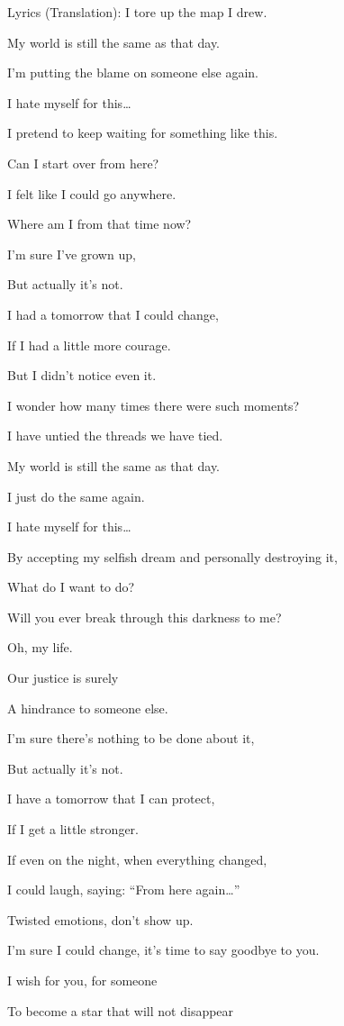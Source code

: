 \documentclass[
  letterpaper,
  DIV=11,
  numbers=noendperiod]{scrreprt}
\begin{document}
Lyrics (Translation): I tore up the map I drew.

My world is still the same as that day.

I'm putting the blame on someone else again.

I hate myself for this\ldots{}

I pretend to keep waiting for something like this.

Can I start over from here?

I felt like I could go anywhere.

Where am I from that time now?

I'm sure I've grown up,

But actually it's not.

I had a tomorrow that I could change,

If I had a little more courage.

But I didn't notice even it.

I wonder how many times there were such moments?

I have untied the threads we have tied.

My world is still the same as that day.

I just do the same again.

I hate myself for this\ldots{}

By accepting my selfish dream and personally destroying it,

What do I want to do?

Will you ever break through this darkness to me?

Oh, my life.

Our justice is surely

A hindrance to someone else.

I'm sure there's nothing to be done about it,

But actually it's not.

I have a tomorrow that I can protect,

If I get a little stronger.

If even on the night, when everything changed,

I could laugh, saying: ``From here again\ldots{}''

Twisted emotions, don't show up.

I'm sure I could change, it's time to say goodbye to you.

I wish for you, for someone

To become a star that will not disappear
\end{document}
